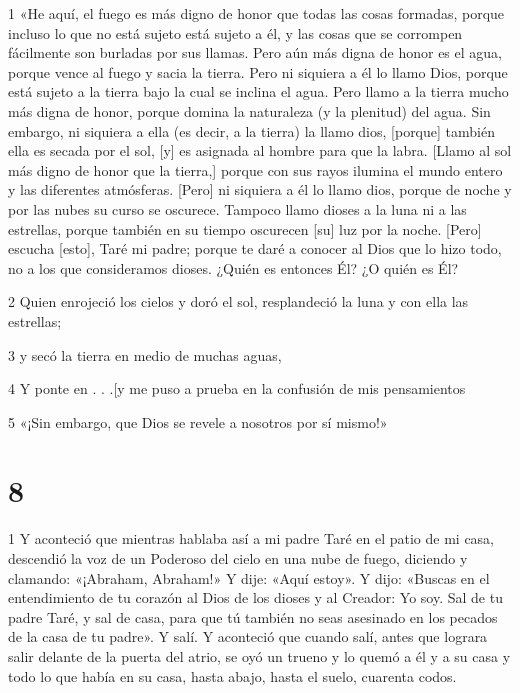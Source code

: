 \par 1 «He aquí, el fuego es más digno de honor que todas las cosas formadas, porque incluso lo que no está sujeto está sujeto a él, y las cosas que se corrompen fácilmente son burladas por sus llamas. Pero aún más digna de honor es el agua, porque vence al fuego y sacia la tierra. Pero ni siquiera a él lo llamo Dios, porque está sujeto a la tierra bajo la cual se inclina el agua. Pero llamo a la tierra mucho más digna de honor, porque domina la naturaleza (y la plenitud) del agua. Sin embargo, ni siquiera a ella (es decir, a la tierra) la llamo dios, [porque] también ella es secada por el sol, [y] es asignada al hombre para que la labra. [Llamo al sol más digno de honor que la tierra,] porque con sus rayos ilumina el mundo entero y las diferentes atmósferas. [Pero] ni siquiera a él lo llamo dios, porque de noche y por las nubes su curso se oscurece. Tampoco llamo dioses a la luna ni a las estrellas, porque también en su tiempo oscurecen [su] luz por la noche. [Pero] escucha [esto], Taré mi padre; porque te daré a conocer al Dios que lo hizo todo, no a los que consideramos dioses. ¿Quién es entonces Él? ¿O quién es Él?

\par 2 Quien enrojeció los cielos y doró el sol, resplandeció la luna y con ella las estrellas;

\par 3 y secó la tierra en medio de muchas aguas,

\par 4 Y ponte en . . .[y me puso a prueba en la confusión de mis pensamientos

\par 5 «¡Sin embargo, que Dios se revele a nosotros por sí mismo!»

\chapter{8}

\par 1 Y aconteció que mientras hablaba así a mi padre Taré en el patio de mi casa, descendió la voz de un Poderoso del cielo en una nube de fuego, diciendo y clamando: «¡Abraham, Abraham!» Y dije: «Aquí estoy». Y dijo: «Buscas en el entendimiento de tu corazón al Dios de los dioses y al Creador: Yo soy. Sal de tu padre Taré, y sal de casa, para que tú también no seas asesinado en los pecados de la casa de tu padre». Y salí. Y aconteció que cuando salí, antes que lograra salir delante de la puerta del atrio, se oyó un trueno y lo quemó a él y a su casa y todo lo que había en su casa, hasta abajo, hasta el suelo, cuarenta codos.

